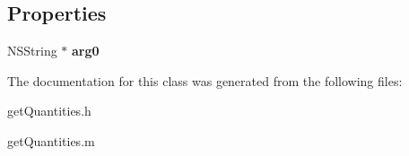 \subsection*{Properties}
\begin{DoxyCompactItemize}
\item 
\hypertarget{interfaceget_quantities_a8b8609b76807ee1713abc2d5bc8e7fd4}{}N\+S\+String $\ast$ {\bfseries arg0}\label{interfaceget_quantities_a8b8609b76807ee1713abc2d5bc8e7fd4}

\end{DoxyCompactItemize}


The documentation for this class was generated from the following files\+:\begin{DoxyCompactItemize}
\item 
get\+Quantities.\+h\item 
get\+Quantities.\+m\end{DoxyCompactItemize}
